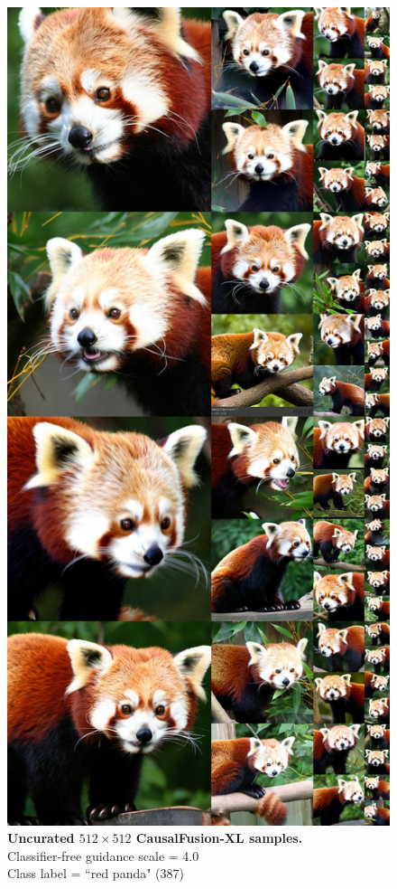 \begin{figure}\centering
\includegraphics[width=\linewidth]{figs/xl512_387_cfg4.0.jpg}
\caption{\textbf{Uncurated $512\times512$ CausalFusion-XL samples.} \\Classifier-free guidance scale = 4.0\\Class label = ``red panda" (387)}\vspace{-2mm}
\label{fig:samples512_2}
\end{figure}


